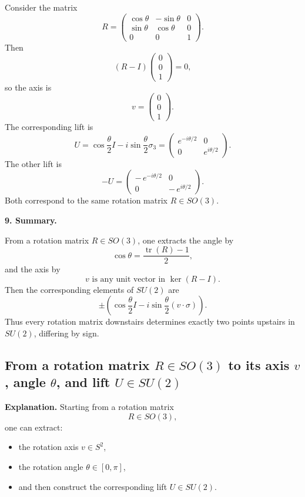 \documentclass[12pt,a4paper]{article}
\theoremstyle{notespace}
\begin{document}
Consider the matrix
\[
R=
\begin{pmatrix}
	\cos\theta & -\sin\theta & 0\\
	\sin\theta & \cos\theta & 0\\
	0&0&1
\end{pmatrix}.
\]
Then
\[
(R-I)
\begin{pmatrix}
	0\\
	0\\
	1
\end{pmatrix}
=0,
\]
so the axis is
\[
v=
\begin{pmatrix}
	0\\
	0\\
	1
\end{pmatrix}.
\]
The corresponding lift is
\[
U=
\cos\frac{\theta}{2}I-i\sin\frac{\theta}{2}\sigma_3
=
\begin{pmatrix}
	e^{-i\theta/2} & 0\\
	0 & e^{i\theta/2}
\end{pmatrix}.
\]
The other lift is
\[
-U=
\begin{pmatrix}
	-\,e^{-i\theta/2} & 0\\
	0 & -\,e^{i\theta/2}
\end{pmatrix}.
\]
Both correspond to the same rotation matrix \(R\in SO(3)\).

\medskip

\textbf{9. Summary.}

From a rotation matrix \(R\in SO(3)\), one extracts the angle by
\[
\boxed{\cos\theta=\frac{\operatorname{tr}(R)-1}{2}},
\]
and the axis by
\[
\boxed{v\text{ is any unit vector in }\ker(R-I).}
\]
Then the corresponding elements of \(SU(2)\) are
\[
\boxed{
	\pm\left(
	\cos\frac{\theta}{2}I
	-
	i\sin\frac{\theta}{2}(v\cdot \sigma)
	\right).
}
\]
Thus every rotation matrix downstairs determines exactly two points upstairs in \(SU(2)\), differing by sign.

\subsection{From a rotation matrix \(R\in SO(3)\) to its axis \(v\), angle \(\theta\), and lift \(U\in SU(2)\)}

\textbf{Explanation.}
Starting from a rotation matrix
\[
R\in SO(3),
\]
one can extract:

\begin{itemize}
	\item the rotation axis \(v\in S^2\),
	\item the rotation angle \(\theta\in[0,\pi]\),
	\item and then construct the corresponding lift \(U\in SU(2)\).
\end{itemize}
\end{document}
